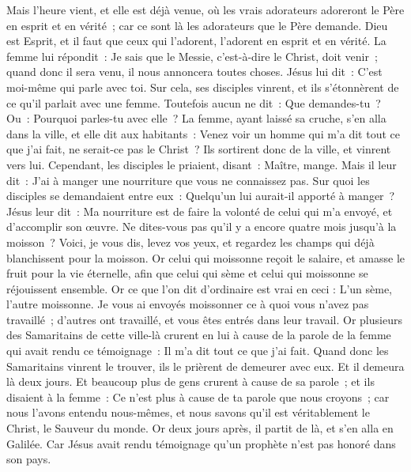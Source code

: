 \begin{multicols}{2}
Mais l'heure vient, et elle est déjà venue, où les vrais adorateurs adoreront le Père en esprit et en vérité~; car ce sont là les adorateurs que le Père demande.
Dieu est Esprit, et il faut que ceux qui l'adorent, l'adorent en esprit et en vérité.
La femme lui répondit~: Je sais que le Messie, c'est-à-dire le Christ, doit venir~; quand donc il sera venu, il nous annoncera toutes choses.
Jésus lui dit~: C'est moi-même qui parle avec toi.
Sur cela, ses disciples vinrent, et ils s'étonnèrent de ce qu'il parlait avec une femme. Toutefois aucun ne dit~: Que demandes-tu~? Ou~: Pourquoi parles-tu avec elle~?
La femme, ayant laissé sa cruche, s'en alla dans la ville, et elle dit aux habitants~:
Venez voir un homme qui m'a dit tout ce que j'ai fait, ne serait-ce pas le Christ~?
Ils sortirent donc de la ville, et vinrent vers lui.
Cependant, les disciples le priaient, disant~: Maître, mange.
Mais il leur dit~: J'ai à manger une nourriture que vous ne connaissez pas.
Sur quoi les disciples se demandaient entre eux~: Quelqu'un lui aurait-il apporté à manger~?
Jésus leur dit~: Ma nourriture est de faire la volonté de celui qui m'a envoyé, et d'accomplir son œuvre.
Ne dites-vous pas qu'il y a encore quatre mois jusqu'à la moisson~? Voici, je vous dis, levez vos yeux, et regardez les champs qui déjà blanchissent pour la moisson.
Or celui qui moissonne reçoit le salaire, et amasse le fruit pour la vie éternelle, afin que celui qui sème et celui qui moissonne se réjouissent ensemble.
Or ce que l'on dit d'ordinaire est vrai en ceci : L'un sème, l'autre moissonne. 
Je vous ai envoyés moissonner ce à quoi vous n'avez pas travaillé~; d'autres ont travaillé, et vous êtes entrés dans leur travail.
Or plusieurs des Samaritains de cette ville-là crurent en lui à cause de la parole de la femme qui avait rendu ce témoignage~: Il m'a dit tout ce que j'ai fait.
Quand donc les Samaritains vinrent le trouver, ils le prièrent de demeurer avec eux. Et il demeura là deux jours.
Et beaucoup plus de gens crurent à cause de sa parole~;
et ils disaient à la femme~: Ce n'est plus à cause de ta parole que nous croyons~; car nous l'avons entendu nous-mêmes, et nous savons qu'il est véritablement le Christ, le Sauveur du monde.
Or deux jours après, il partit de là, et s'en alla en Galilée.
Car Jésus avait rendu témoignage qu'un prophète n'est pas honoré dans son pays.

\end{multicols}
